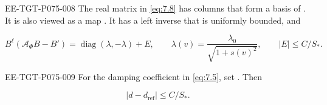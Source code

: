 \begin{lemma}
\begin{EESegment}{EE-TGT-P075-008}
The real  matrix  in \eqref{eq:7.8} has columns that form a basis of . It is also viewed as a map . It has a left inverse  that is uniformly bounded, and
\end{EESegment}
\begin{equation}
B^\ell(\mathcal A_\Phi B-B')=\operatorname{diag}(\lambda,-\lambda)+E,
\qquad
\lambda(v)=\frac{\lambda_0}{\sqrt{1+s(v)^2}},
\qquad
|E|\leq C/S_*.
\tag{7.10}\label{eq:7.10}
\end{equation}
\begin{EESegment}{EE-TGT-P075-009}
For the damping coefficient  in \eqref{eq:7.5}, set . Then
\end{EESegment}
\begin{equation}
|d-d_{\mathrm{ref}}|\leq C/S_*.
\tag{7.11}\label{eq:7.11}
\end{equation}
\end{lemma}

